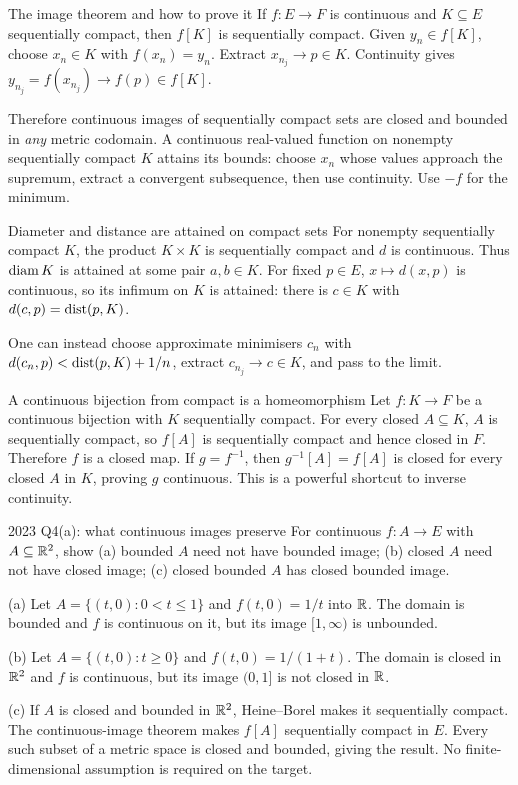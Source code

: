 \begin{note}{The image theorem and how to prove it}
If $f:E\to F$ is continuous and $K\subseteq E$ sequentially compact, then $f[K]$ is sequentially compact. Given $y_n\in f[K]$, choose $x_n\in K$ with $f(x_n)=y_n$. Extract $x_{n_j}\to p\in K$. Continuity gives $y_{n_j}=f(x_{n_j})\to f(p)\in f[K]$.

Therefore continuous images of sequentially compact sets are closed and bounded in \emph{any} metric codomain. A continuous real-valued function on nonempty sequentially compact $K$ attains its bounds: choose $x_n$ whose values approach the supremum, extract a convergent subsequence, then use continuity. Use $-f$ for the minimum.
\end{note}
\begin{note}{Diameter and distance are attained on compact sets}
For nonempty sequentially compact $K$, the product $K\times K$ is sequentially compact and $d$ is continuous. Thus $\operatorname{diam} K$ is attained at some pair $a,b\in K$. For fixed $p\in E$, $x\mapsto d(x,p)$ is continuous, so its infimum on $K$ is attained: there is $c\in K$ with $d(c,p)=\operatorname{dist}(p,K)$.

One can instead choose approximate minimisers $c_n$ with $d(c_n,p)<\operatorname{dist}(p,K)+1/n$, extract $c_{n_j}\to c\in K$, and pass to the limit.
\end{note}
\begin{note}{A continuous bijection from compact is a homeomorphism}
Let $f:K\to F$ be a continuous bijection with $K$ sequentially compact. For every closed $A\subseteq K$, $A$ is sequentially compact, so $f[A]$ is sequentially compact and hence closed in $F$. Therefore $f$ is a closed map. If $g=f^{-1}$, then $g^{-1}[A]=f[A]$ is closed for every closed $A$ in $K$, proving $g$ continuous. This is a powerful shortcut to inverse continuity.
\end{note}
\begin{exam}{2023 Q4(a): what continuous images preserve}
For continuous $f:A\to E$ with $A\subseteq\mathbb R^2$, show (a) bounded $A$ need not have bounded image; (b) closed $A$ need not have closed image; (c) closed bounded $A$ has closed bounded image.
\end{exam}
\begin{answer}
(a) Let $A=\{(t,0):0<t\le1\}$ and $f(t,0)=1/t$ into $\mathbb R$. The domain is bounded and $f$ is continuous on it, but its image $[1,\infty)$ is unbounded.

(b) Let $A=\{(t,0):t\ge0\}$ and $f(t,0)=1/(1+t)$. The domain is closed in $\mathbb R^2$ and $f$ is continuous, but its image $(0,1]$ is not closed in $\mathbb R$.

(c) If $A$ is closed and bounded in $\mathbb R^2$, Heine--Borel makes it sequentially compact. The continuous-image theorem makes $f[A]$ sequentially compact in $E$. Every such subset of a metric space is closed and bounded, giving the result. No finite-dimensional assumption is required on the target.
\end{answer}
